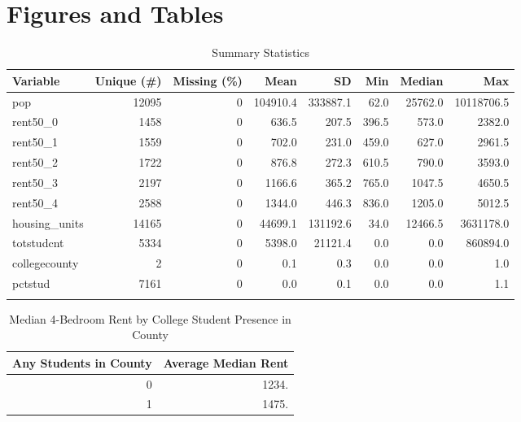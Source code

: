 \documentclass[12pt,english]{article}
\begin{document}
\vfill
\pagebreak{}
\begin{spacing}{1.0}

\nocite{*}

\end{spacing}

\vfill
\pagebreak{}

\section*{Figures and Tables}\label{sec:figTables}
\begin{table}[ht]
\centering
\caption{Summary Statistics}
\begin{tabular}{lrrrrrrr}
\toprule
Variable & Unique (\#) & Missing (\%) & Mean & SD & Min & Median & Max \\
\midrule
pop & 12095 & 0 & 104910.4 & 333887.1 & 62.0 & 25762.0 & 10118706.5 \\
rent50\_0 & 1458 & 0 & 636.5 & 207.5 & 396.5 & 573.0 & 2382.0 \\
rent50\_1 & 1559 & 0 & 702.0 & 231.0 & 459.0 & 627.0 & 2961.5 \\
rent50\_2 & 1722 & 0 & 876.8 & 272.3 &610.5	& 790.0	& 3593.0 \\
rent50\_3 & 2197 & 0 & 1166.6& 365.2& 765.0	& 1047.5 & 4650.5 \\
rent50\_4 & 2588 & 0 & 1344.0 & 446.3 & 836.0 & 1205.0 & 5012.5 \\
housing\_units & 14165 & 0 & 44699.1 & 131192.6 & 34.0 & 12466.5 & 3631178.0 \\
totstudcnt & 5334 & 0 & 5398.0 & 21121.4 & 0.0 & 0.0 & 860894.0 \\
collegecounty & 2 & 0 & 0.1 & 0.3 & 0.0 & 0.0 & 1.0 \\
pctstud & 7161 & 0 & 0.0 & 0.1 & 0.0 & 0.0 & 1.1 \\
\bottomrule
\label{tab:sumstat}
\end{tabular}
\end{table}
\clearpage


\begin{table}[ht]
\centering
\caption{Median 4-Bedroom Rent by College Student Presence in County}
\begin{tabular}{rr}
\hline
Any Students in County & Average Median Rent \\
\hline
0 & 1234.\\
1 & 1475.\\
\hline
\end{tabular}
\label{tab:rent}
\end{table}
\clearpage
\end{document}
